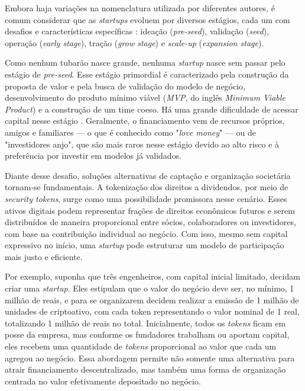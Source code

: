 \documentclass[12pt, a4paper, oneside, openright, chapter=TITLE]{abntex2}
\begin{document}
Embora haja variações na nomenclatura utilizada por diferentes autores, é comum considerar que as \textit{startups} evoluem por diversos estágios, cada um com desafios e características específicas \cite{sebrae2023}: ideação (\textit{pre-seed}), validação (\textit{seed}), operação (\textit{early stage}), tração (\textit{grow stage}) e \textit{scale-up} (\textit{expansion stage}).

Como nenhum tubarão nasce grande, nenhuma \textit{startup} nasce sem passar pelo estágio de   \textit{pre-seed}. Esse estágio primordial é caracterizado pela construção da proposta de valor e pela busca de validação do modelo de negócio, desenvolvimento do produto mínimo viável (\textit{MVP}, do inglês \textit{Minimum Viable Product}) e a construção de um time coeso. Há uma grande dificuldade de acessar capital nesse estágio \cite{azevedo2025}. Geralmente, o financiamento vem de recursos próprios, amigos e familiares — o que é conhecido como "\textit{love money}" — ou de "investidores anjo", que são mais raros nesse estágio devido ao alto risco e à preferência por investir em modelos já validados.

Diante desse desafio, soluções alternativas de captação e organização societária tornam-se fundamentais. A tokenização dos direitos a dividendos, por meio de \textit{security tokens}, surge como uma possibilidade promissora nesse cenário. Esses ativos digitais podem representar frações de direitos econômicos futuros e serem distribuídos de maneira proporcional entre sócios, colaboradores ou investidores, com base na contribuição individual ao negócio. Com isso, mesmo sem capital expressivo no início, uma \textit{startup} pode estruturar um modelo de participação mais justo e eficiente.

Por exemplo, suponha que três engenheiros, com capital inicial limitado, decidam criar uma \textit{startup}. Eles estipulam que o valor do negócio deve ser, no mínimo, 1 milhão de reais, e para se organizarem decidem realizar a emissão de 1 milhão de unidades de criptoativo, com cada token representando o valor nominal de 1 real, totalizando 1 milhão de reais no total. Inicialmente, todos os \textit{tokens} ficam em posse da empresa, mas conforme os fundadores trabalham ou aportam capital, eles recebem uma quantidade de \textit{tokens} proporcional ao valor que cada um agregou ao negócio. Essa abordagem permite não somente uma alternativa para atrair financiamento descentralizado, mas também uma forma de organização centrada no valor efetivamente depositado no negócio.
\end{document}
